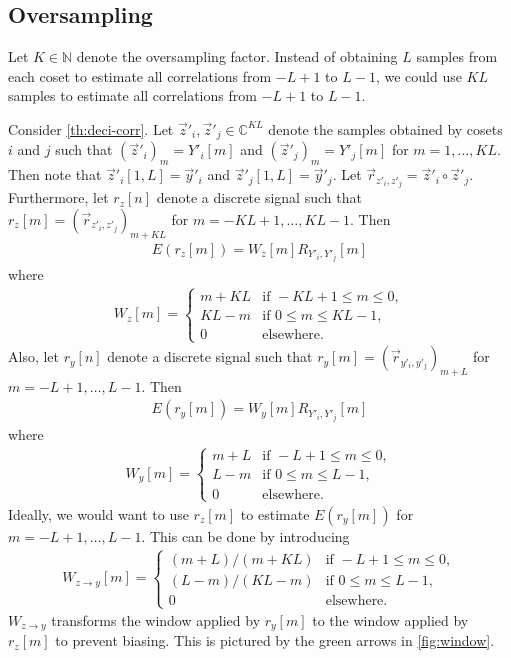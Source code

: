 \documentclass[a4paper, openany, oneside]{memoir}
\begin{document}
\subsection{Oversampling}
Let $K \in \mathbb{N}$ denote the oversampling factor. Instead of obtaining $L$ samples from each coset to estimate all correlations from $-L+1$ to $L-1$, we could use $KL$ samples to estimate all correlations from $-L+1$ to $L-1$.

Consider \cref{th:deci-corr}. Let $\vec{z}'_i, \vec{z}'_j \in \mathbb{C}^{KL}$ denote the samples obtained by cosets $i$ and $j$ such that $(\vec{z}'_i)_m = Y'_i[m]$ and $(\vec{z}'_j)_m=Y'_j[m]$ for $m = 1,\ldots,KL$. Then note that $\vec{z}'_i[1,L]=\vec{y}'_i$ and $\vec{z}'_j[1,L]=\vec{y}'_j$. Let $\vec{r}_{z'_i,z'_j} = \vec{z}'_i \circ \vec{z}'_j$. Furthermore, let $r_z[n]$ denote a discrete signal such that $r_z[m] = (\vec{r}_{z'_i,z'_j})_{m+KL}$ for $m = -KL+1,\ldots,KL-1$. Then
\begin{align*}
    E(r_z[m]) = W_z[m]R_{Y'_i,Y'_j}[m]
\end{align*}
where
\begin{align*}
    W_z[m] = \begin{cases}
        m + KL & \text{if } -KL + 1 \le m \le 0, \\
        KL - m & \text{if } 0 \le m \le KL - 1, \\
        0 & \text{elsewhere.}
    \end{cases}
\end{align*}
Also, let $r_y[n]$ denote a discrete signal such that $r_y[m] = (\vec{r}_{y'_i,y'_j})_{m+L}$ for $m = -L+1,\ldots,L-1$. Then
\begin{align*}
    E(r_y[m]) = W_y[m]R_{Y'_i,Y'_j}[m]
\end{align*}
where
\begin{align*}
    W_y[m] = \begin{cases}
        m + L & \text{if } -L+1 \le m \le 0, \\
        L - m & \text{if } 0 \le m \le L - 1, \\
        0 & \text{elsewhere.}
    \end{cases}
\end{align*}
Ideally, we would want to use $r_z[m]$ to estimate $E(r_y[m])$ for $m = -L+1,\ldots,L-1$. This can be done by introducing
\begin{align*}
    W_{z \to y}[m] = \begin{cases}
        (m + L)/(m + KL) & \text{if } -L+1 \le m \le 0, \\
        (L - m)/(KL - m) & \text{if } 0 \le m \le L - 1, \\
        0 & \text{elsewhere.}
    \end{cases}
\end{align*}
$W_{z \to y}$ transforms the window applied by $r_y[m]$ to the window applied by $r_z[m]$ to prevent biasing. This is pictured by the green arrows in \cref{fig:window}.
\end{document}
